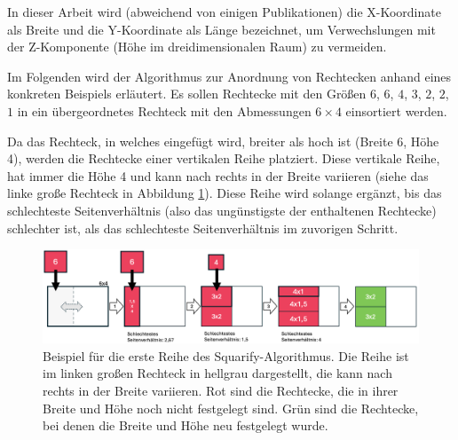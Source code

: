 In dieser Arbeit wird (abweichend von einigen Publikationen) die X-Koordinate als Breite und die Y-Koordinate als Länge bezeichnet, um Verwechslungen mit der Z-Komponente (Höhe im dreidimensionalen Raum) zu vermeiden.

\smallskip

Im Folgenden wird der Algorithmus zur Anordnung von Rechtecken anhand eines konkreten Beispiels erläutert. Es sollen Rechtecke mit den Größen $6$, $6$, $4$, $3$, $2$, $2$, $1$ in ein übergeordnetes Rechteck mit den Abmessungen $6 \times 4$ einsortiert werden. 

Da das Rechteck, in welches eingefügt wird, breiter als hoch ist (Breite 6, Höhe 4), werden die Rechtecke einer vertikalen Reihe platziert. Diese vertikale Reihe, hat immer die Höhe 4 und kann nach rechts in der Breite variieren (siehe das linke große Rechteck in Abbildung \ref{fig:squarify_example_1}). Diese Reihe wird solange ergänzt, bis das schlechteste Seitenverhältnis (also das ungünstigste der enthaltenen Rechtecke) schlechter ist, als das schlechteste Seitenverhältnis im zuvorigen Schritt.

\begin{figure}
    \centering
    \includegraphics[width=1\textwidth]{images/squarify_example_1.png}
    \caption{Beispiel für die erste Reihe des Squarify-Algorithmus. Die Reihe ist im linken großen Rechteck in hellgrau dargestellt, die kann nach rechts in der Breite variieren. Rot sind die Rechtecke, die in ihrer Breite und Höhe noch nicht festgelegt sind. Grün sind die Rechtecke, bei denen die Breite und Höhe neu festgelegt wurde.}
    \label{fig:squarify_example_1}
\end{figure}

